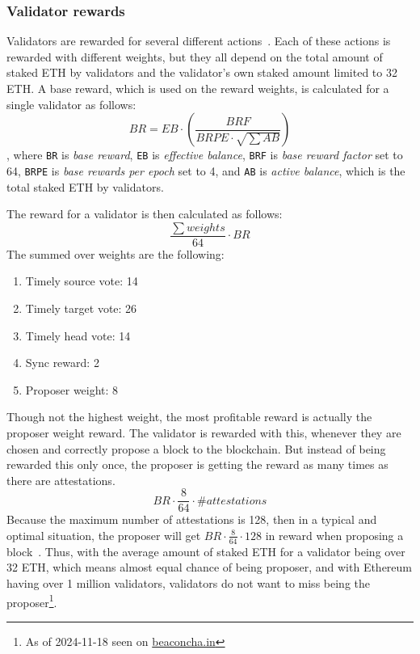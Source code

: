\subsubsection{Validator rewards}\label{subsubsec:valrewards}
Validators are rewarded for several different actions~\cite{PoSRewAndPen}.
Each of these actions is rewarded with different weights,
but they all depend on the total amount of staked ETH by validators and the validator's own staked amount limited to 32 ETH\@.
A base reward, which is used on the reward weights, is calculated for a single validator as follows:
\begin{equation}
    BR = EB\cdot(\frac{BRF}{BRPE\cdot \sqrt{\sum{AB}}})
    \label{eq:basereward}
\end{equation}, where \texttt{BR} is \textit{base reward},
\texttt{EB} is \textit{effective balance}, \texttt{BRF} is \textit{base reward factor} set to 64,
\texttt{BRPE} is \textit{base rewards per epoch} set to 4,
and \texttt{AB} is \textit{active balance}, which is the total staked ETH by validators.

The reward for a validator is then calculated as follows:
\begin{equation}
    \frac{\sum{weights}}{64}\cdot BR
    \label{eq:valrewards}
\end{equation}
The summed over weights are the following:
\begin{enumerate}
    \item Timely source vote: 14
    \item Timely target vote: 26
    \item Timely head vote: 14
    \item Sync reward: 2
    \item Proposer weight: 8
\end{enumerate}
Though not the highest weight, the most profitable reward is actually the proposer weight reward.
The validator is rewarded with this, whenever they are chosen and correctly propose a block to the blockchain.
But instead of being rewarded this only once,
the proposer is getting the reward as many times as there are attestations.
\begin{equation}
    BR\cdot\frac{8}{64}\cdot \#attestations\label
    {eq:propreward}
\end{equation}
Because the maximum number of attestations is 128,
then in a typical and optimal situation,
the proposer will get $BR\cdot\frac{8}{64}\cdot128$ in reward
when proposing a block~\cite{PoSRewAndPen,consensus-spec-phase-0}.
Thus, with the average amount of staked ETH for a validator being over 32 ETH, which means almost equal chance of being proposer, and with Ethereum having over 1 million validators, validators do not want to miss being the proposer\footnote{As of 2024-11-18 seen on \href{https://beaconcha.in/}{beaconcha.in}}.

